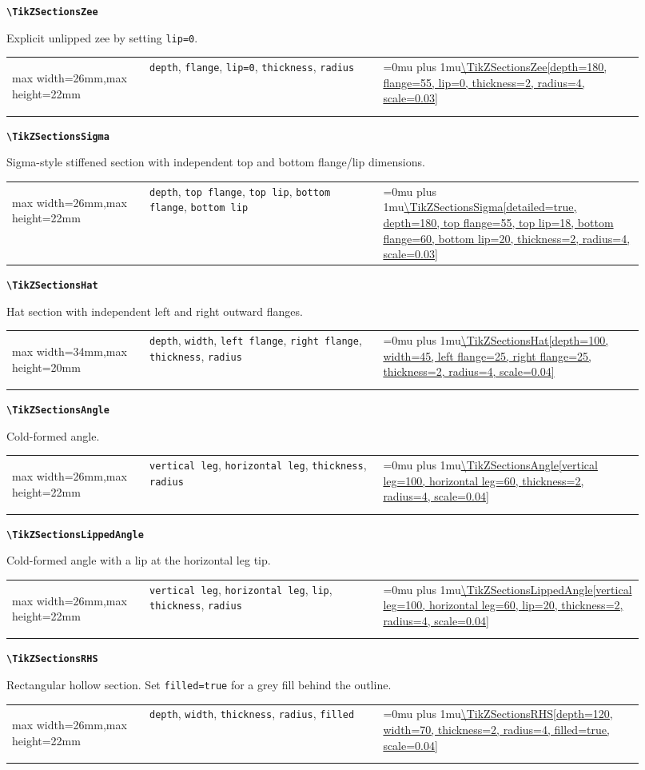 \documentclass[10pt]{article}
\makeatletter
\newcommand{\command}[1]{\texttt{\textbackslash #1}}
\newcommand{\keyname}[1]{\texttt{#1}}
\newcommand{\CodeInline}[1]{%
  \begingroup
  \ttfamily\scriptsize\raggedright\Urlmuskip=0mu plus 1mu\url{#1}%
  \endgroup
}
\newcommand{\ShapePreview}[1]{%
  \begin{center}
  \begin{adjustbox}{max width=26mm,max height=22mm}
    \begin{tikzpicture}
      #1
    \end{tikzpicture}
  \end{adjustbox}
  \end{center}
}
\newcommand{\WideShapePreview}[1]{%
  \begin{center}
  \begin{adjustbox}{max width=34mm,max height=20mm}
    \begin{tikzpicture}
      #1
    \end{tikzpicture}
  \end{adjustbox}
  \end{center}
}
\newcommand{\ReferenceRow}[6]{%
  \textbf{\command{#1}}\par
  #2\par
  \vspace{2pt}
  \begin{tabular}{@{}p{0.20\linewidth}p{0.34\linewidth}p{0.38\linewidth}@{}}
    #6 & \footnotesize #3 & \CodeInline{#4}
  \end{tabular}
  \par\vspace{4mm}
}
\makeatother
\begin{document}
\ReferenceRow
  {TikZSectionsZee}
  {Explicit unlipped zee by setting \keyname{lip=0}.}
  {\keyname{depth}, \keyname{flange}, \keyname{lip=0}, \keyname{thickness}, \keyname{radius}}
  {\TikZSectionsZee[depth=180, flange=55, lip=0, thickness=2, radius=4, scale=0.03]}
  {}
  {\ShapePreview{\TikZSectionsZee[depth=180, flange=55, lip=0, thickness=2, radius=4, scale=0.03]}}

\ReferenceRow
  {TikZSectionsSigma}
  {Sigma-style stiffened section with independent top and bottom flange/lip dimensions.}
  {\keyname{depth}, \keyname{top flange}, \keyname{top lip}, \keyname{bottom flange}, \keyname{bottom lip}}
  {\TikZSectionsSigma[detailed=true, depth=180, top flange=55, top lip=18, bottom flange=60, bottom lip=20, thickness=2, radius=4, scale=0.03]}
  {}
  {\ShapePreview{\TikZSectionsSigma[detailed=true, depth=180, top flange=55, top lip=18, bottom flange=60, bottom lip=20, thickness=2, radius=4, scale=0.03]}}

\ReferenceRow
  {TikZSectionsHat}
  {Hat section with independent left and right outward flanges.}
  {\keyname{depth}, \keyname{width}, \keyname{left flange}, \keyname{right flange}, \keyname{thickness}, \keyname{radius}}
  {\TikZSectionsHat[depth=100, width=45, left flange=25, right flange=25, thickness=2, radius=4, scale=0.04]}
  {}
  {\WideShapePreview{\TikZSectionsHat[depth=100, width=45, left flange=25, right flange=25, thickness=2, radius=4, scale=0.04]}}

\ReferenceRow
  {TikZSectionsAngle}
  {Cold-formed angle.}
  {\keyname{vertical leg}, \keyname{horizontal leg}, \keyname{thickness}, \keyname{radius}}
  {\TikZSectionsAngle[vertical leg=100, horizontal leg=60, thickness=2, radius=4, scale=0.04]}
  {}
  {\ShapePreview{\TikZSectionsAngle[vertical leg=100, horizontal leg=60, thickness=2, radius=4, scale=0.04]}}

\ReferenceRow
  {TikZSectionsLippedAngle}
  {Cold-formed angle with a lip at the horizontal leg tip.}
  {\keyname{vertical leg}, \keyname{horizontal leg}, \keyname{lip}, \keyname{thickness}, \keyname{radius}}
  {\TikZSectionsLippedAngle[vertical leg=100, horizontal leg=60, lip=20, thickness=2, radius=4, scale=0.04]}
  {}
  {\ShapePreview{\TikZSectionsLippedAngle[vertical leg=100, horizontal leg=60, lip=20, thickness=2, radius=4, scale=0.04]}}

\ReferenceRow
  {TikZSectionsRHS}
  {Rectangular hollow section. Set \keyname{filled=true} for a grey fill behind the outline.}
  {\keyname{depth}, \keyname{width}, \keyname{thickness}, \keyname{radius}, \keyname{filled}}
  {\TikZSectionsRHS[depth=120, width=70, thickness=2, radius=4, filled=true, scale=0.04]}
  {}
  {\ShapePreview{\TikZSectionsRHS[depth=120, width=70, thickness=2, radius=4, filled=true, scale=0.04]}}
\end{document}

